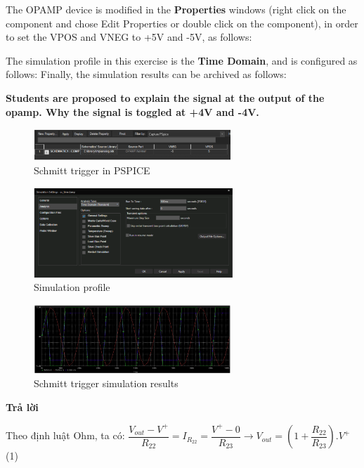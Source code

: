 The OPAMP device is modified in the \textbf{Properties} windows (right click on the component
and chose Edit Properties or double click on the component), in order to set the VPOS
and VNEG to +5V and -5V, as follows:

The simulation profile in this exercise is the \textbf{Time Domain}, and is configured as follows:
Finally, the simulation results can be archived as follows:

\textbf{Students are proposed to explain the signal at the output of the opamp. Why the signal
is toggled at +4V and -4V.}


\begin{figure}[ht]
    \centering
    \includegraphics[width=0.66\textwidth]{graphics/ex1/f25.png}
    \caption{Schmitt trigger in PSPICE}
\end{figure}

\begin{figure}[ht]
    \centering
    \includegraphics[width=0.6666\textwidth]{graphics/ex1/f26.png}
    \caption{Simulation profile}
\end{figure}
\pagebreak

\begin{figure}[ht]
    \centering
    \includegraphics[width=0.66\textwidth]{graphics/ex1/f27.png}
    \caption{Schmitt trigger simulation results}
\end{figure}

\textbf{Trả lời}

Theo định luật Ohm, ta có: $\dfrac{V_{out} - V^+}{R_{22}} = I_{R_{22}} = \dfrac{V^+ - 0}{R_{23}} \rightarrow V_{out} = (1 + \dfrac{R_{22}}{R_{23}}).V^+$ (1)

